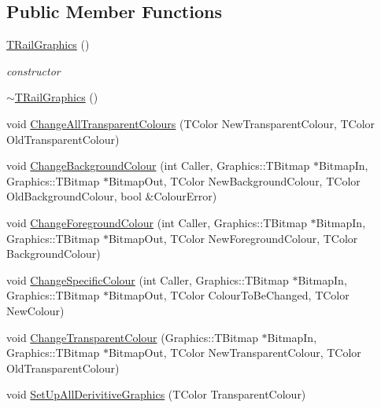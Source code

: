 \subsection*{Public Member Functions}
\begin{DoxyCompactItemize}
\item 
\mbox{\label{class_t_rail_graphics_acd3dfcf9686870772b1708030f11b1d4}} 
\mbox{\hyperlink{class_t_rail_graphics_acd3dfcf9686870772b1708030f11b1d4}{T\+Rail\+Graphics}} ()
\begin{DoxyCompactList}\small\item\em constructor \end{DoxyCompactList}\item 
\mbox{\hyperlink{class_t_rail_graphics_ad243415e657236ecca97fa1d064cf127}{$\sim$\+T\+Rail\+Graphics}} ()
\item 
void \mbox{\hyperlink{class_t_rail_graphics_a5121c6d8b8fa69eefc293ca51cddce88}{Change\+All\+Transparent\+Colours}} (T\+Color New\+Transparent\+Colour, T\+Color Old\+Transparent\+Colour)
\item 
void \mbox{\hyperlink{class_t_rail_graphics_a74d7dcd5e17ef156d8c216c8e524de11}{Change\+Background\+Colour}} (int Caller, Graphics\+::\+T\+Bitmap $\ast$Bitmap\+In, Graphics\+::\+T\+Bitmap $\ast$Bitmap\+Out, T\+Color New\+Background\+Colour, T\+Color Old\+Background\+Colour, bool \&Colour\+Error)
\item 
void \mbox{\hyperlink{class_t_rail_graphics_aa2dace651659e084ec23c9961f5819b1}{Change\+Foreground\+Colour}} (int Caller, Graphics\+::\+T\+Bitmap $\ast$Bitmap\+In, Graphics\+::\+T\+Bitmap $\ast$Bitmap\+Out, T\+Color New\+Foreground\+Colour, T\+Color Background\+Colour)
\item 
void \mbox{\hyperlink{class_t_rail_graphics_ac4e48e6ee19e01724adb0d490762d548}{Change\+Specific\+Colour}} (int Caller, Graphics\+::\+T\+Bitmap $\ast$Bitmap\+In, Graphics\+::\+T\+Bitmap $\ast$Bitmap\+Out, T\+Color Colour\+To\+Be\+Changed, T\+Color New\+Colour)
\item 
void \mbox{\hyperlink{class_t_rail_graphics_a89a3e3a91129c4d02f4606478781b519}{Change\+Transparent\+Colour}} (Graphics\+::\+T\+Bitmap $\ast$Bitmap\+In, Graphics\+::\+T\+Bitmap $\ast$Bitmap\+Out, T\+Color New\+Transparent\+Colour, T\+Color Old\+Transparent\+Colour)
\item 
void \mbox{\hyperlink{class_t_rail_graphics_ae19696d461eea07c5444ed4c9714acf3}{Set\+Up\+All\+Derivitive\+Graphics}} (T\+Color Transparent\+Colour)
\end{DoxyCompactItemize}
